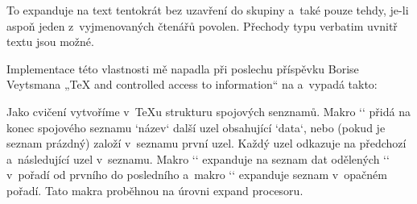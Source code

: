 To expanduje na text tentokrát bez uzavření do skupiny a~také pouze tehdy, je-li aspoň jeden z~vyjmenovaných čtenářů povolen. Přechody typu verbatim uvnitř textu jsou možné. 



Implementace této vlastnosti mě napadla při poslechu příspěvku Borise Veytsmana „TeX and controlled access to information“ na  a~vypadá takto: 

\begtt
\def\showif#1{\showifA#1,s:!,} 
\def\showifbegin#1{\showifA#1,l:!,} 
\def\showifA#1#2,{\expandafter\ifx\csname s:#1#2\endcsname\relax 
   \expandafter\showifA \else \csname s:#1#2\expandafter\endcsname \fi} 
\long{} 
\long\expandafter{} 
\long\expandafter{} 
\def\showifend{} 
 
\def\showallow#1{\expandafter\let\csname s:#1\endcsname=\showifT} 
\def\showdeny#1{\expandafter\let\csname s:#1\endcsname=\relax} 
\endtt

 


Jako cvičení vytvoříme v~TeXu strukturu spojových senznamů. Makro `` přidá na konec spojového seznamu `název` další uzel obsahující `data`, nebo (pokud je seznam prázdný) založí v~seznamu první uzel. Každý uzel odkazuje na předchozí a~následující uzel v~seznamu. Makro `` expanduje na seznam dat odělených `\seplist` v~pořadí od prvního do posledního a~makro `` expanduje seznam v~opačném pořadí. Tato makra proběhnou na úrovni expand procesoru. 

\begtt
\newcount\listnum 
 
\def\addtolist#1#2{\advance\listnum by1 
   \expandafter\ifx\csname l:#1:1\endcsname \relax 
      \setlistnode \relax \relax {#2}{\the\listnum}%
      \expandafter\edef\csname l:#1:0\endcsname{\the\listnum}%
   \else 
      \edef\lastnodenum{\csname l:#1:1\endcsname}%
      \expandafter\resetlistnode \csname l:\the\listnum\endcsname 2\lastnodenum 
      \expandafter\setlistnode \csname l:\lastnodenum\endcsname \relax {#2}{\the\listnum}%
   \fi 
   \expandafter \edef\csname l:#1:1\endcsname{\the\listnum}%
} 
\def\setlistnode #1#2#3#4{\expandafter\def\csname l:#4\endcsname{#1#2{#3}}} 
\def\resetlistnode #1#2#3{\def\tmp{\expandafter\def\csname l:#3\endcsname}%
   \expandafter\expandafter\expandafter\resetlistnumA \csname l:#3\endcsname #2#1} 
\def\resetlistnumA #1#2#3#4#5{\ifcase #4\or\tmp{#5#2{#3}}\or\tmp{#1#5{#3}}\or\tmp{#1#2{#5}}\fi} 
 
